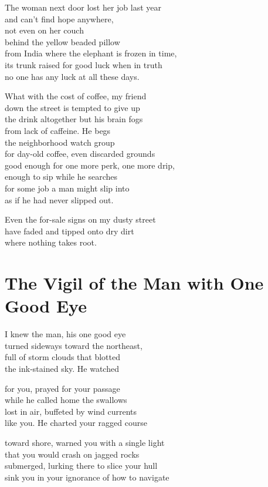 \documentclass[twoside,10pt]{book}
\begin{document}
The woman next door lost her job last year\\
and can't find hope anywhere,\\
not even on her couch\\
behind the yellow beaded pillow\\
from India where the elephant is frozen in time,\\
its trunk raised for good luck when in truth\\
no one has any luck at all these days.

What with the cost of coffee, my friend\\
down the street is tempted to give up\\
the drink altogether but his brain fogs\\
from lack of caffeine. He begs\\
the neighborhood watch group\\
for day-old coffee, even discarded grounds\\
good enough for one more perk, one more drip,\\
enough to sip while he searches\\
for some job a man might slip into\\
as if he had never slipped out.

Even the for-sale signs on my dusty street\\
have faded and tipped onto dry dirt\\
where nothing takes root.


\clearpage
\section{The Vigil of the Man with One Good Eye}

I knew the man, his one good eye\\
turned sideways toward the northeast,\\
full of storm clouds that blotted\\
the ink-stained sky. He watched

for you, prayed for your passage\\
while he called home the swallows\\
lost in air, buffeted by wind currents\\
like you. He charted your ragged course

toward shore, warned you with a single light\\
that you would crash on jagged rocks\\
submerged, lurking there to slice your hull\\
sink you in your ignorance of how to navigate
\end{document}
